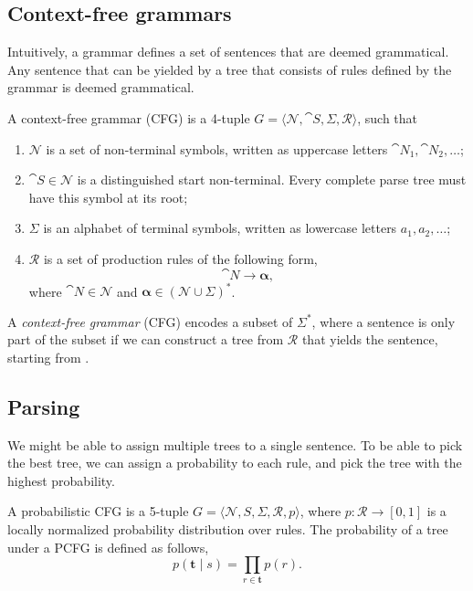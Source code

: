 \subsection{Context-free grammars}

Intuitively, a grammar defines a set of sentences that are deemed
grammatical. Any sentence that can be yielded by a tree that consists of
rules defined by the grammar is deemed grammatical.

\begin{definition}
  A context-free grammar (CFG) is a 4-tuple $G=\langle \mathcal{N}, \cat{S},
  \Sigma,\mathcal{R} \rangle$, such that
  \begin{enumerate}
    \item $\mathcal{N}$ is a set of non-terminal symbols, written as uppercase
      letters $\cat{N}_1, \cat{N}_2, \ldots$;
    \item $\cat{S} \in \mathcal{N}$ is a distinguished start non-terminal.
      Every complete parse tree must have this symbol at its root;
    \item $\Sigma$ is an alphabet of terminal symbols, written as lowercase
      letters $a_1,a_2,\ldots$;
    \item $\mathcal{R}$ is a set of production rules of the following form, \[
        \cat{N} \to \bm{\alpha}
      ,\]
      where $\cat{N}\in\mathcal{N}$ and $\bm{\alpha}\in (\mathcal{N} \cup
      \Sigma)^*$.
  \end{enumerate}
\end{definition}

A \textit{context-free grammar} (CFG) encodes a subset of $\Sigma^*$, where a
sentence is only part of the subset if we can construct a tree from
$\mathcal{R}$ that yields the sentence, starting from .

\subsection{Parsing}

We might be able to assign multiple trees to a single sentence. To be able to
pick the best tree, we can assign a probability to each rule, and pick the
tree with the highest probability.

\begin{definition}
  A probabilistic CFG is a 5-tuple $G=\langle \mathcal{N}, S,
  \Sigma,\mathcal{R}, p \rangle$, where $p: \mathcal{R}\to [0,1]$ is a locally
  normalized probability distribution over rules. The probability of a tree
  under a PCFG is defined as follows, \[
    p(\bm{t} \mid s) = \prod_{r\in\bm{t}} p(r)
  .\]
\end{definition}

